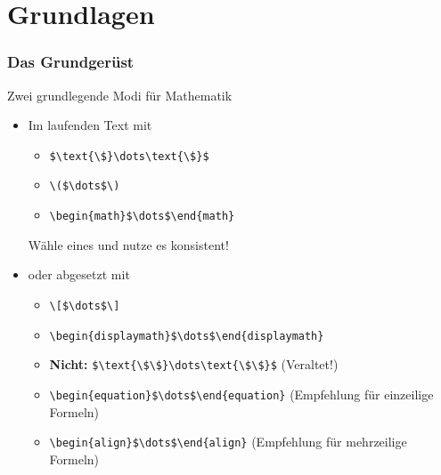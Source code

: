 
\section{Grundlagen}

\begin{frame}[fragile]
  \frametitle{Das Grundgerüst}


  \begin{block}{Zwei grundlegende Modi für Mathematik}
    \begin{itemize}
    \item<+-> Im laufenden Text mit
      \begin{itemize}
        \item \lstinline!$\text{\$}\dots\text{\$}$!
        \item \lstinline!\($\dots$\)!
        \item \lstinline!\begin{math}$\dots$\end{math}!
      \end{itemize}
      Wähle eines und nutze es konsistent!
    \item<+-> oder abgesetzt mit
      \begin{itemize}
        \item \lstinline!\[$\dots$\]!
        \item \lstinline!\begin{displaymath}$\dots$\end{displaymath}!
        \item \textbf{Nicht:} \lstinline!$\text{\$\$}\dots\text{\$\$}$! (Veraltet!)
        \item \lstinline!\begin{equation}$\dots$\end{equation}! (Empfehlung für einzeilige Formeln)
        \item \lstinline!\begin{align}$\dots$\end{align}! (Empfehlung für mehrzeilige Formeln)
      \end{itemize}
    \end{itemize}
  \end{block}
\end{frame}

